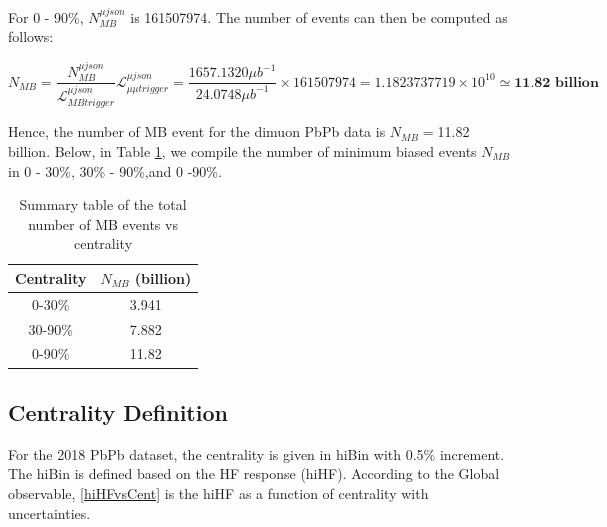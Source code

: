 \fi

For 0 - 90\%, $N_{MB}^{\mu json}$ is 161507974. The number of events can then be computed as follows:

\begin{equation}
N_{MB} = \frac{N^{\mu json}_{MB}}{\mathcal{L}_{MB trigger}^{\mu json}} \mathcal{L}_{\mu\mu trigger}^{\mu json} = \frac{1657.1320 \mu b^{-1}}{24.0748  \mu b^{-1}} \times 161507974 =  1.1823737719 \times 10^{10} \simeq  \textbf{11.82 billion}
\end{equation}

Hence, the number of MB event for the dimuon PbPb data is $N_{MB} = $11.82 billion. Below, in Table \ref{NMBUsedCent}, we compile the number of minimum biased events $N_{MB}$ in 0 - 30\%, 30\% - 90\%,and 0 -90\%. 

\begin{table}[h]
\begin{center}
\caption{Summary table of the total number of MB events vs centrality}
\vspace{1em}
\label{NMBUsedCent}
  \begin{tabular}{ |c | c| }
    \hline 
Centrality & $N_{MB}$ (billion) \\
     \hline
         \hline
0-30\% &  3.941 \\
30-90\% & 7.882 \\
0-90\% & 11.82 \\
     \hline
    \hline
\end{tabular}
\end{center}
\end{table}


\subsection{Centrality Definition}

For the 2018 PbPb dataset, the centrality is given in hiBin with 0.5\% increment. The hiBin is defined based on the HF response (hiHF). According to the Global observable, \ref{hiHFvsCent} is the hiHF as a function of centrality with uncertainties.


